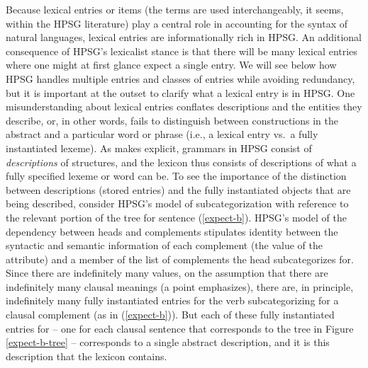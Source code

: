 \documentclass[output=paper
                ,modfonts
                ,nonflat
	        ,collection
	        ,collectionchapter
	        ,collectiontoclongg
 	        ,biblatex
                ,babelshorthands
                ,newtxmath
                ,draftmode
                ,colorlinks, citecolor=brown
]{./langsci/langscibook}
\begin{document}
{Because lexical entries or items (the terms are used interchangeably, it seems, within the HPSG literature) play a central role in accounting for the syntax of natural languages, lexical entries are informationally rich in HPSG. 
An additional consequence of HPSG's lexicalist stance is that there will be many lexical entries where one might at first glance expect a single entry. We will see below how HPSG handles multiple entries and classes of entries while avoiding redundancy, but it is important at the outset to clarify what a lexical entry is in HPSG. 
One misunderstanding about lexical entries conflates descriptions and the entities they describe, or, in other words, fails to distinguish between constructions in the abstract and a particular word or phrase (i.e., a lexical entry vs.\ a fully instantiated lexeme). 
As  makes explicit, grammars in HPSG consist of \emph{descriptions} of structures, and the lexicon thus consists of descriptions of what a fully specified lexeme or word can be. 
To see the importance of the distinction between descriptions (stored entries) and the fully instantiated objects that are being described, consider HPSG's model of subcategorization with reference to the relevant portion of the tree for sentence (\ref{expect-b}). 
HPSG's model of the dependency between heads and complements stipulates identity between the syntactic and semantic information of each complement (the value of the  attribute) and a member of the list of complements the head subcategorizes for. 
Since there are indefinitely many  values, on the assumption that there are indefinitely many clausal meanings (a point \citealt[8--9]{Jackendoff1990} emphasizes), there are, in principle, indefinitely many fully instantiated entries for the verb  subcategorizing for a clausal complement (as in (\ref{expect-b})). 
But each of these fully instantiated entries for  -- one for each clausal sentence that corresponds to the tree in Figure \ref{expect-b-tree} -- corresponds to a single abstract description, and it is this description that the lexicon contains. 

}
\end{document}

